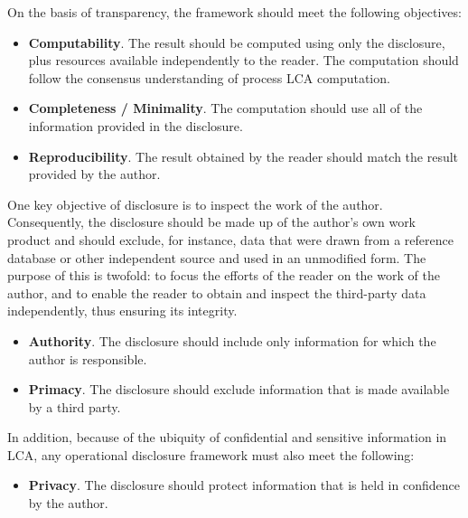 On the basis of transparency, the framework should meet the following objectives:
\begin{itemize}
\item \textbf{Computability}. The result should be computed using only the disclosure, plus resources available independently to the reader.  The computation should follow the consensus understanding of process LCA computation.
\item \textbf{Completeness / Minimality}.  The computation should use all of the information provided in the disclosure.
\item \textbf{Reproducibility}.  The result obtained by the reader should match the result provided by the author.
\end{itemize}
One key objective of disclosure is to inspect the work of the author.  Consequently, the disclosure should be made up of the author's own work product and should exclude, for instance, data that were drawn from a reference database or other independent source and used in an unmodified form.  The purpose of this is twofold: to focus the efforts of the reader on the work of the author, and to enable the reader to obtain and inspect the third-party data independently, thus ensuring its integrity.
\begin{itemize}
\item \textbf{Authority}.  The disclosure should include only information for which the author is responsible.
\item \textbf{Primacy}.  The disclosure should exclude information that is made available by a third party.
\end{itemize}
In addition, because of the ubiquity of confidential and sensitive information in LCA, any operational disclosure framework must also meet the following:
\begin{itemize}
\item \textbf{Privacy}.  The disclosure should protect information that is held in confidence by the author.
\end{itemize}

\endinput


Let's say the author (whom we'll call Alice) wishes to make a disclosure to the reader (whom we'll call Rob) that would enable the reader to \emph{automatically} reproduce a given numerical result.  

The framework advanced in this paper aims to specify the contents of a \emph{minimal disclosure} by the author that would enable the reader to  reproduce 



